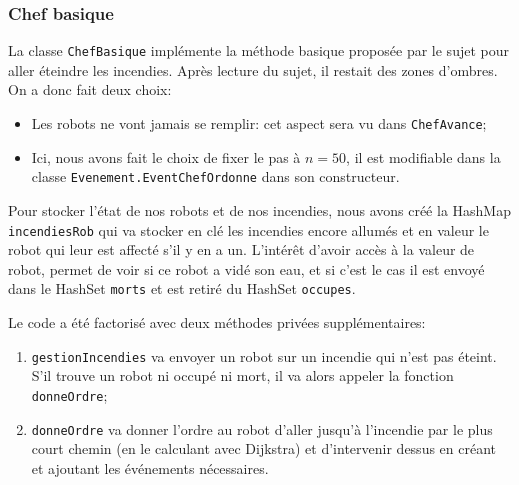 \documentclass[a4paper,10pt]{article} %
\begin{document}
\subsubsection{Chef basique}
La  classe \texttt{ChefBasique} implémente la méthode basique proposée par le sujet pour aller éteindre les incendies.
Après lecture du sujet, il restait des zones d'ombres. On a donc fait deux choix:
\begin{itemize}
    \item Les robots ne vont jamais se remplir: cet aspect sera vu dans \texttt{ChefAvance};
    \item Ici, nous avons fait le choix de fixer le pas à $n=50$, il est modifiable dans la classe \texttt{Evenement.EventChefOrdonne} 
    dans son constructeur.
\end{itemize}

Pour stocker l'état de nos robots et de nos incendies, nous avons créé la HashMap \texttt{incendiesRob} qui va stocker en clé 
les incendies encore allumés et en valeur le robot qui leur est affecté s'il y en a un. L'intérêt d'avoir accès à la valeur de robot,
permet de voir si ce robot a vidé son eau, et si c'est le cas il est envoyé dans le HashSet \texttt{morts} 
et est retiré du HashSet \texttt{occupes}.

Le code a été factorisé avec deux méthodes privées supplémentaires:
\begin{enumerate}
    \item \texttt{gestionIncendies} va envoyer un robot sur un incendie qui n'est pas éteint. S'il trouve un robot ni occupé ni mort,
    il va alors appeler la fonction \texttt{donneOrdre};
    \item \texttt{donneOrdre} va donner l'ordre au robot d'aller jusqu'à l'incendie par le plus court chemin (en le calculant avec Dijkstra)
    et d'intervenir dessus en créant et ajoutant les événements nécessaires.
\end{enumerate}
\end{document}
